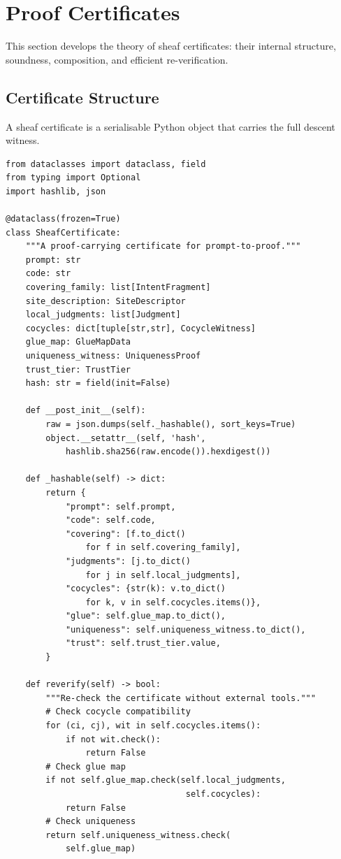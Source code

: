 \documentclass[11pt]{article}
\begin{document}
\section{Proof Certificates}\label{sec:certificates}

This section develops the theory of sheaf certificates: their
internal structure, soundness, composition, and efficient
re-verification.

\subsection{Certificate Structure}\label{sec:cert-structure}

A sheaf certificate is a serialisable Python object that carries
the full descent witness.

\begin{lstlisting}[caption={Certificate data structure.},label={lst:cert-structure}]
from dataclasses import dataclass, field
from typing import Optional
import hashlib, json

@dataclass(frozen=True)
class SheafCertificate:
    """A proof-carrying certificate for prompt-to-proof."""
    prompt: str
    code: str
    covering_family: list[IntentFragment]
    site_description: SiteDescriptor
    local_judgments: list[Judgment]
    cocycles: dict[tuple[str,str], CocycleWitness]
    glue_map: GlueMapData
    uniqueness_witness: UniquenessProof
    trust_tier: TrustTier
    hash: str = field(init=False)

    def __post_init__(self):
        raw = json.dumps(self._hashable(), sort_keys=True)
        object.__setattr__(self, 'hash',
            hashlib.sha256(raw.encode()).hexdigest())

    def _hashable(self) -> dict:
        return {
            "prompt": self.prompt,
            "code": self.code,
            "covering": [f.to_dict()
                for f in self.covering_family],
            "judgments": [j.to_dict()
                for j in self.local_judgments],
            "cocycles": {str(k): v.to_dict()
                for k, v in self.cocycles.items()},
            "glue": self.glue_map.to_dict(),
            "uniqueness": self.uniqueness_witness.to_dict(),
            "trust": self.trust_tier.value,
        }

    def reverify(self) -> bool:
        """Re-check the certificate without external tools."""
        # Check cocycle compatibility
        for (ci, cj), wit in self.cocycles.items():
            if not wit.check():
                return False
        # Check glue map
        if not self.glue_map.check(self.local_judgments,
                                    self.cocycles):
            return False
        # Check uniqueness
        return self.uniqueness_witness.check(
            self.glue_map)
\end{lstlisting}
\end{document}
